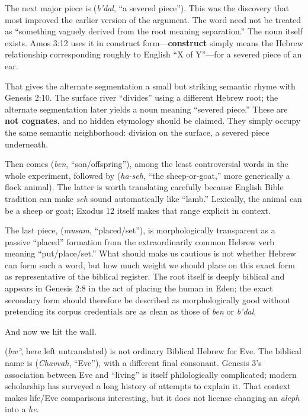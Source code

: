 The next major piece is  (\textit{b'dal}, ``a severed piece''). This was the discovery that most improved the earlier version of the argument. The word need not be treated as ``something vaguely derived from the root meaning separation.'' The noun itself exists. Amos 3:12 uses it in construct form---\textbf{construct} simply means the Hebrew relationship corresponding roughly to English ``X of Y''---for a severed piece of an ear.\cite{BDB}

That gives the alternate segmentation a small but striking semantic rhyme with Genesis 2:10. The surface river ``divides'' using a different Hebrew root; the alternate segmentation later yields a noun meaning ``severed piece.'' These are \textbf{not cognates}, and no hidden etymology should be claimed. They simply occupy the same semantic neighborhood: division on the surface, a severed piece underneath.\cite{MasoreticGenesis,BDB}

Then comes  (\textit{ben}, ``son/offspring''), among the least controversial words in the whole experiment, followed by  (\textit{ha-seh}, ``the sheep-or-goat,'' more generically a flock animal). The latter is worth translating carefully because English Bible tradition can make \textit{seh} sound automatically like ``lamb.'' Lexically, the animal can be a sheep or goat; Exodus 12 itself makes that range explicit in context.\cite{BDB}

The last piece,  (\textit{musam}, ``placed/set''), is morphologically transparent as a passive ``placed'' formation from the extraordinarily common Hebrew verb meaning ``put/place/set.'' What should make us cautious is not whether Hebrew can form such a word, but how much weight we should place on this exact form as representative of the biblical register. The root itself is deeply biblical and appears in Genesis 2:8 in the act of placing the human in Eden; the exact secondary form should therefore be described as morphologically good without pretending its corpus credentials are as clean as those of \textit{ben} or \textit{b'dal}.\cite{BDB}

And now we hit the wall.

 (\textit{ḥwʾ}, here left untranslated) is not ordinary Biblical Hebrew for Eve. The biblical name is  (\textit{Chavvah}, ``Eve''), with a different final consonant. Genesis 3's association between Eve and ``living'' is itself philologically complicated; modern scholarship has surveyed a long history of attempts to explain it. That context makes life/Eve comparisons interesting, but it does not license changing an \textit{aleph} into a \textit{he}.\cite{Napora2022}

